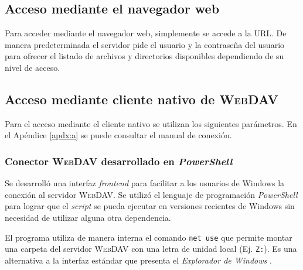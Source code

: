       \subsection {Acceso mediante el navegador web}

Para acceder mediante el navegador web, simplemente se accede a la \textsc{\gls{URL}}. De manera predeterminada el servidor pide el usuario y la contrase\~{n}a del usuario para ofrecer el listado de  archivos y directorios disponibles dependiendo de su nivel de acceso.

      \subsection {Acceso mediante cliente nativo de \textsc{WebDAV}}

Para el acceso mediante el cliente nativo se utilizan los siguientes par\'{a}metros. En el \textup{Ap\'{e}ndice \ref{apdx:a}} se puede consultar el manual de conexi\'{o}n.

{
 \begin{table}[H]
 \caption{Par\'{a}metros de conexi\'{o}n \textsc{WebDAV}}{}
 \label{tab:webdav-parameters}
 \noindent{} %
 \end{table}
}

        \subsubsection {Conector \textsc{WebDAV} desarrollado en \textsl{PowerShell}}

Se desarroll\'{o} una interfaz \emph{\gls{frontend}} para facilitar a los usuarios de Windows la conexi\'{o}n al servidor \textsc{\gls{WebDAV}}. Se utiliz\'{o} el lenguaje de programaci\'{o}n \emph{\gls{PowerShell}} para lograr que el \emph{\gls{script}} se pueda ejecutar en versiones recientes de Windows sin necesidad de utilizar alguna otra dependencia.

El programa utiliza de manera interna el comando \texttt{net use} \cite{_net_????} que permite montar una carpeta del servidor \textsc{\gls{WebDAV}} con una letra de unidad local (Ej. \texttt{Z:}). Es una alternativa a la interfaz est\'{a}ndar que presenta el \textit{Explorador de Windows} \cite{_create_????}.

